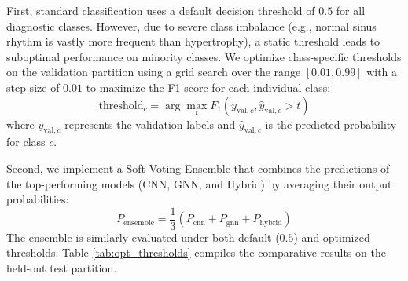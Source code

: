 \documentclass[12pt,a4paper]{report}
\begin{document}
First, standard classification uses a default decision threshold of $0.5$ for all diagnostic classes. However, due to severe class imbalance (e.g., normal sinus rhythm is vastly more frequent than hypertrophy), a static threshold leads to suboptimal performance on minority classes. We optimize class-specific thresholds on the validation partition using a grid search over the range $[0.01, 0.99]$ with a step size of $0.01$ to maximize the F1-score for each individual class:
\begin{equation}
    \text{threshold}_c = \arg\max_{t} F_1(y_{\text{val}, c}, \hat{y}_{\text{val}, c} > t)
\end{equation}
where $y_{\text{val}, c}$ represents the validation labels and $\hat{y}_{\text{val}, c}$ is the predicted probability for class $c$.

Second, we implement a Soft Voting Ensemble that combines the predictions of the top-performing models (CNN, GNN, and Hybrid) by averaging their output probabilities:
\begin{equation}
    P_{\text{ensemble}} = \frac{1}{3} \left( P_{\text{cnn}} + P_{\text{gnn}} + P_{\text{hybrid}} \right)
\end{equation}
The ensemble is similarly evaluated under both default ($0.5$) and optimized thresholds. Table \ref{tab:opt_thresholds} compiles the comparative results on the held-out test partition.
\end{document}
